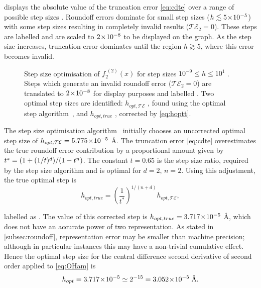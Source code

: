  displays the absolute value of the truncation error \cref{eq:cdte} over a range of possible step sizes .
Roundoff errors dominate for small step sizes ($h \lesssim 5\!\times\!10^{-5}$) with some step sizes resulting in completely invalid results (\ie $\mathcal{TE}_2 = 0$).
These steps are labelled  and are scaled to $2\!\times\!10^{-8}$ to be displayed on the graph.
As the step size increases, truncation error dominates until the region $h \gtrsim 5$, where this error becomes invalid.
\begin{figure}[htp]
\centering
\resizebox{\columnwidth}{!}{}
\caption[Step size optimisation of $f_2^{\;(2)}(x)$]{\label{fig:hopt3pt}Step size optimisation of $f_2^{\;(2)}(x)$ for step sizes $10^{-9}\!\leq\! h\! \leq\! 10^1$ . Steps which generate an invalid roundoff error (\ie $\mathcal{TE}_2 = 0$) are translated to $2\!\times\!10^{-8}$ for display purposes and labelled . Two optimal step sizes are identified: $h_{opt,\mathcal{TE}}$ , found using the optimal step algorithm~\cite{Mathur2012}, and $h_{opt,true}$ , corrected by \cref{eq:hoptt}.}
\end{figure}

The step size optimisation algorithm~\cite{Mathur2012} initially chooses an uncorrected optimal step size  of $h_{opt,\mathcal{TE}} = 5.775\!\times\!10^{-5}$ Å.
The truncation error \cref{eq:cdte} overestimates the true roundoff error contribution by a proportional amount given by $\cramped{t^* = (1+(1/t)^d)/(1-t^n)}$.
The constant $t = 0.65$ is the step size ratio, required by the step size algorithm and is optimal for $d=2$, $n=2$.
Using this adjustment, the true optimal step is
\begin{equation}
h_{opt,true} = \left(\frac{1}{t^*}\right)^{1/(n+d)}h_{opt,\mathcal{TE}},\label{eq:hoptt}
\end{equation}

labelled as .
The value of this corrected step is $h_{opt,true} = 3.717\!\times\!10^{-5}$ Å, which does not have an accurate power of two representation.
As stated in \cref{subsec:roundoff}, representation error may be smaller than machine precision; although in particular instances this may have a non-trivial cumulative effect.
Hence the optimal step size for the central difference second derivative of second order applied to \cref{eq:OHam} is
\begin{equation}
h_{opt} = 3.717\!\times\!10^{-5} \simeq 2^{-15} = 3.052\!\times\!10^{-5}\;\text{Å}.
\end{equation}


